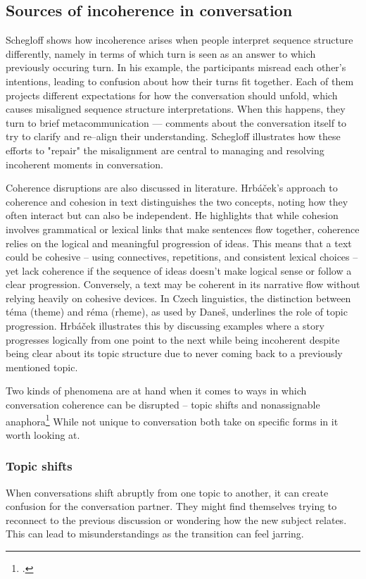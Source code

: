 \documentclass[12pt]{report}
\begin{document}
{\subsection{Sources of incoherence in conversation}
\par
Schegloff shows how incoherence arises when
people interpret sequence structure differently,
namely in terms of which turn is seen as an answer to which previously occuring turn.
In his example, the participants misread each other’s intentions,
leading to confusion about how their turns fit together.
Each of them projects different expectations for how the conversation should unfold,
which causes misaligned sequence structure interpretations.
When this happens,
they turn to brief metacommunication — comments about the conversation itself
to try to clarify and re–align their understanding.
Schegloff illustrates how these
efforts to "repair" the misalignment are central to
managing and resolving incoherent moments in conversation.

\par
Coherence disruptions are also discussed in literature.
Hrbáček’s approach to coherence and cohesion in text distinguishes the two concepts,
noting how they often interact but can also be independent.
He highlights that while
cohesion involves grammatical or lexical links that
make sentences flow together,
coherence relies on the logical and meaningful progression of ideas.
This means that a text could be cohesive –
using connectives, repetitions, and consistent lexical choices –
yet lack coherence if the sequence of ideas doesn’t
make logical sense or follow a clear progression.
Conversely, a text may be coherent in its narrative flow without
relying heavily on cohesive devices.
In Czech linguistics,
the distinction between téma (theme) and réma (rheme), as used by Daneš,
underlines the role of topic progression.
Hrbáček illustrates this by discussing examples where
a story progresses logically from one point to the next while
being incoherent despite being clear about its topic structure
due to never coming back to a previously mentioned topic.

\par
Two kinds of phenomena are at hand when it comes to
ways in which conversation coherence can be disrupted –
topic shifts and nonassignable anaphora\footcite{bublitz1999disturbed}
While not unique to conversation
both take on specific forms in it worth looking at.

\subsubsection{Topic shifts}
\par
    When conversations shift abruptly from one topic to another,
    it can create confusion for the conversation partner.
    They might find themselves trying to
    reconnect to the previous discussion or
    wondering how the new subject relates.
    This can lead to misunderstandings
    as the transition can feel jarring.

}
\end{document}
